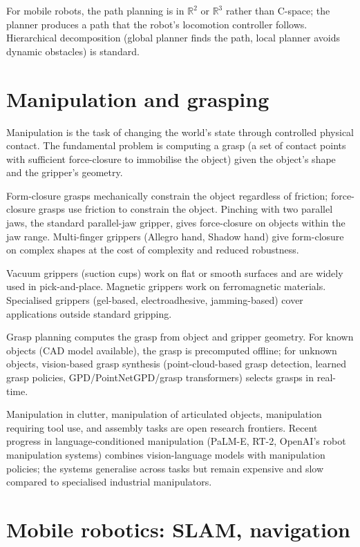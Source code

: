 For mobile robots, the path planning is in $\mathbb{R}^2$ or $\mathbb{R}^3$ rather than C-space; the planner produces a path that the robot's locomotion controller follows. Hierarchical decomposition (global planner finds the path, local planner avoids dynamic obstacles) is standard.

\section{Manipulation and grasping}

Manipulation is the task of changing the world's state through controlled physical contact. The fundamental problem is computing a grasp (a set of contact points with sufficient force-closure to immobilise the object) given the object's shape and the gripper's geometry.

Form-closure grasps mechanically constrain the object regardless of friction; force-closure grasps use friction to constrain the object. Pinching with two parallel jaws, the standard parallel-jaw gripper, gives force-closure on objects within the jaw range. Multi-finger grippers (Allegro hand, Shadow hand) give form-closure on complex shapes at the cost of complexity and reduced robustness.

Vacuum grippers (suction cups) work on flat or smooth surfaces and are widely used in pick-and-place. Magnetic grippers work on ferromagnetic materials. Specialised grippers (gel-based, electroadhesive, jamming-based) cover applications outside standard gripping.

Grasp planning computes the grasp from object and gripper geometry. For known objects (CAD model available), the grasp is precomputed offline; for unknown objects, vision-based grasp synthesis (point-cloud-based grasp detection, learned grasp policies, GPD/PointNetGPD/grasp transformers) selects grasps in real-time.

Manipulation in clutter, manipulation of articulated objects, manipulation requiring tool use, and assembly tasks are open research frontiers. Recent progress in language-conditioned manipulation (PaLM-E, RT-2, OpenAI's robot manipulation systems) combines vision-language models with manipulation policies; the systems generalise across tasks but remain expensive and slow compared to specialised industrial manipulators.

\section{Mobile robotics: SLAM, navigation}

